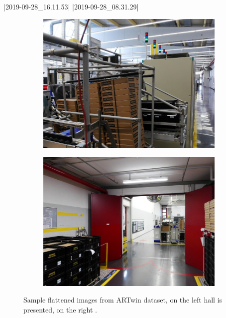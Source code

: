|2019-09-28_16.11.53|
|2019-09-28_08.31.29|
\begin{figure}
	\centering
	\begin{subfigure}{.5\textwidth}
		\centering
		\includegraphics[width=.9\textwidth]{../graphics/2019-09-28_16.11.53_00000_x0_z90_reference.png}
	\end{subfigure}%
	\begin{subfigure}{.5\textwidth}
		\centering
		\includegraphics[width=.9\textwidth]{../graphics/2019-09-28_08.31.29_00000_x0_z60_reference.png}
	\end{subfigure}
	\caption[Sample flattened images from ARTwin dataset]{Sample
        flattened images from ARTwin dataset, on the left hall
        \protect{} is presented, on the right
        \protect{}.}\label{fig:artwin_dataset}
\end{figure}

